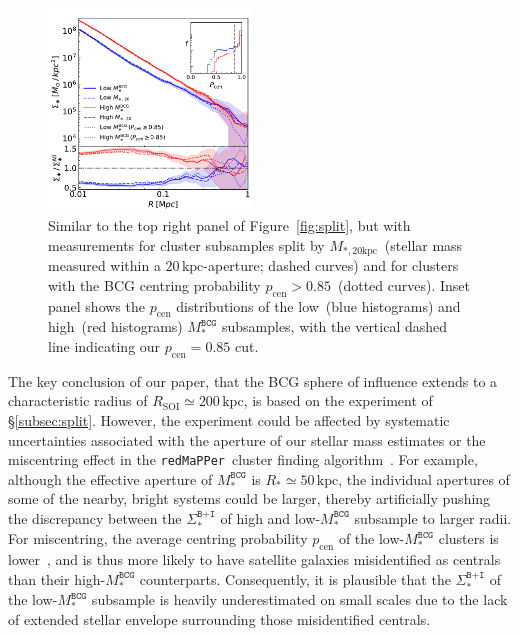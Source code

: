\documentclass[fleqn,usenatbib]{mnras}
\newcommand{\rsoi}{R_{\mathrm{SOI}}}
\newcommand{\sigbi}{\Sigma_*^{\texttt{B+I}}}
\newcommand{\msbcg}{M_*^{\texttt{BCG}}}
\newcommand{\mtwenty}{M_{*,20\kpc}}
\newcommand{\kpc}{\mathrm{kpc}}
\newcommand{\pcen}{p_{\mathrm{cen}}}
\newcommand\redmapper{\texttt{redMaPPer}}
\begin{document}
\begin{figure}
    \hspace{-0.5cm}\includegraphics[width=0.48\textwidth]{fig/M_bin_SM_compare.pdf}
    \caption{Similar to the top right panel of Figure~\ref{fig:split}, but
    with measurements for cluster subsamples split by $\mtwenty$~(stellar
    mass measured within a $20\,\kpc$-aperture; dashed curves) and for
    clusters with the BCG centring probability $\pcen{>}0.85$~(dotted
    curves). Inset panel shows the $\pcen$ distributions of the low~(blue
    histograms) and high~(red histograms) $\msbcg$ subsamples, with the
    vertical dashed line indicating our $\pcen{=}0.85$ cut.
    \label{fig:systest} }
\end{figure}

The key conclusion of our paper, that the BCG sphere of influence extends
to a characteristic radius of $\rsoi{\simeq}200\,\kpc$, is based on the
experiment of \S\ref{subsec:split}. However, the experiment could be
affected by systematic uncertainties associated with the aperture of our
stellar mass estimates or the miscentring effect in the \redmapper~cluster
finding algorithm~\citep{Johnston2007, Oguri2011, Rozo2014, Hollowood2019}.
For example, although the effective aperture of $\msbcg$ is
$R_*{\simeq}50\,\kpc$, the individual apertures of some of the nearby,
bright systems could be larger, thereby artificially pushing the
discrepancy between the $\sigbi$ of high and low-$\msbcg$ subsample to
larger radii.  For miscentring, the average centring probability $\pcen$ of
the low-$\msbcg$ clusters is lower~\citep[e.g., due to projection
effects; see][]{Zu2017}, and is thus more likely to have satellite galaxies
misidentified as centrals than their high-$\msbcg$ counterparts.
Consequently, it is plausible that the $\sigbi$ of the low-$\msbcg$
subsample is heavily underestimated on small scales due to the lack of
extended stellar envelope surrounding those misidentified centrals.
\end{document}
